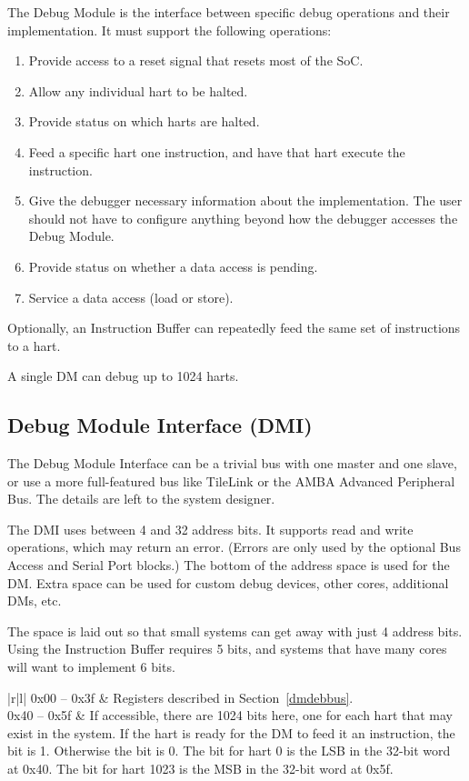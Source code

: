 \documentclass{article}
\newenvironment{steps}[1]
{
   \vspace{1ex}
   \noindent
   #1
   \begin{enumerate}[nosep]
}
{
   \end{enumerate}
   \vspace{1ex}
}
\begin{document}
\begin{steps}{The Debug Module is the interface between specific debug
    operations and their implementation. It must support the following
    operations:}
\item Provide access to a reset signal that resets most of the SoC.
\item Allow any individual hart to be halted.
\item Provide status on which harts are halted.
\item Feed a specific hart one instruction, and have that hart execute the
    instruction.
\item Give the debugger necessary information about the implementation. The user
    should not have to configure anything beyond how the debugger accesses the
    Debug Module.
\item Provide status on whether a data access is pending.
\item Service a data access (load or store).
\end{steps}

Optionally, an Instruction Buffer can repeatedly feed the same set of
instructions to a hart.

A single DM can debug up to 1024 harts.

\subsection{Debug Module Interface (DMI)}

The Debug Module Interface can be a trivial bus with one master and one slave,
or use a more full-featured bus like TileLink or the AMBA Advanced Peripheral
Bus. The details are left to the system designer.

The DMI uses between 4 and 32 address bits.  It supports read and write
operations, which may return an error. (Errors are only used by the optional
Bus Access and Serial Port blocks.) The bottom of the address space is used for
the DM. Extra space can be used for custom debug devices, other cores,
additional DMs, etc.

The space is laid out so that small systems can get away with just 4 address
bits. Using the Instruction Buffer requires 5 bits, and systems that have many
cores will want to implement 6 bits.

\begin{table}[htp]
    \centering
    \caption{Debug Module Interface Address Space}
    \label{tab:header}
    \begin{tabulary}{\textwidth}{|r|l|}
        \hline
        0x00 -- 0x3f & Registers described in Section~\ref{dmdebbus}. \\
        \hline
        0x40 -- 0x5f & If accessible, there are 1024 bits here, one for each
        hart that may exist in the system. If the hart is ready for the DM to
        feed it an instruction, the bit is 1. Otherwise the bit is 0. The bit
        for hart 0 is the LSB in the 32-bit word at 0x40. The bit for hart 1023
        is the MSB in the 32-bit word at 0x5f. \\
        \hline
    \end{tabulary}
\end{table}
\end{document}
